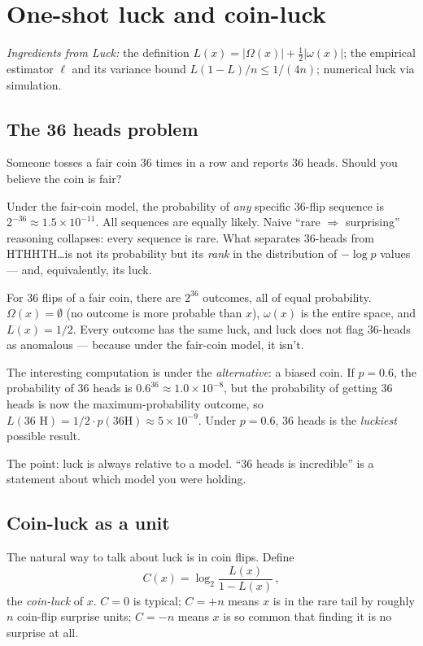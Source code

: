 \chapter{One-shot luck and coin-luck}\label{ch:coin}

\textit{Ingredients from Luck:} the definition $L(x) = |\Omega(x)| +
\tfrac{1}{2}|\omega(x)|$; the empirical estimator $\ell$ and its variance
bound $L(1-L)/n \le 1/(4n)$; numerical luck via simulation.

\section{The 36 heads problem}

Someone tosses a fair coin 36 times in a row and reports 36 heads.  Should
you believe the coin is fair?

Under the fair-coin model, the probability of \emph{any} specific 36-flip
sequence is $2^{-36} \approx 1.5 \times 10^{-11}$.  All sequences are
equally likely.  Naive ``rare $\Rightarrow$ surprising'' reasoning
collapses: every sequence is rare.  What separates 36-heads from
HTHHTH\ldots is not its probability but its \emph{rank} in the
distribution of $-\log p$ values --- and, equivalently, its luck.

For 36 flips of a fair coin, there are $2^{36}$ outcomes, all of equal
probability.  $\Omega(x) = \emptyset$ (no outcome is more probable than
$x$), $\omega(x)$ is the entire space, and $L(x) = 1/2$.  Every outcome
has the same luck, and luck does not flag 36-heads as anomalous --- because
under the fair-coin model, it isn't.

The interesting computation is under the \emph{alternative}: a biased
coin.  If $p = 0.6$, the probability of 36 heads is $0.6^{36} \approx
1.0 \times 10^{-8}$, but the probability of getting 36 heads is now the
maximum-probability outcome, so $L(\text{36 H}) = 1/2 \cdot p(36\text{H})
\approx 5 \times 10^{-9}$.  Under $p=0.6$, 36 heads is the
\emph{luckiest} possible result.

The point: luck is always relative to a model.  ``36 heads is incredible''
is a statement about which model you were holding.

\section{Coin-luck as a unit}

The natural way to talk about luck is in coin flips.  Define
\[
  C(x) = \log_2 \frac{L(x)}{1 - L(x)}\,,
\]
the \emph{coin-luck} of $x$.  $C = 0$ is typical; $C = +n$ means $x$ is in
the rare tail by roughly $n$ coin-flip surprise units; $C = -n$ means $x$
is so common that finding it is no surprise at all.


